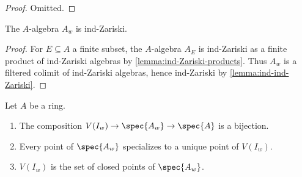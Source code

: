 \begin{proof}
  \leanok
  Omitted.
\end{proof}

\begin{lemma}
    The $A$-algebra $A_{w}$ is ind-Zariski.
    \label{lemma:w-localization-ind-Zariski}
    \leanok
\end{lemma}

\begin{proof}
    \leanok
    For $E \subseteq A$ a finite subset, the $A$-algebra $A_E$ is ind-Zariski
    as a finite product of ind-Zariski algebras by \ref{lemma:ind-Zariski-products}.
    Thus $A_w$ is a filtered colimit of ind-Zariski algebras, hence ind-Zariski
    by \ref{lemma:ind-ind-Zariski}.
\end{proof}

\begin{lemma}
    \label{lemma:w-localization-closed-points}
    \leanok
    Let $A$ be a ring.
    \begin{enumerate}
        \item The composition $V(I_w) \to \spec{A_w} \to \spec{A}$ is a bijection.
            \label{item:w-localization-bijection}
        \item Every point of $\spec{A_w}$ specializes to a unique point of $V(I_w)$. \label{item:w-localization-specializes}
        \item $V(I_w)$ is the set of closed points of $\spec{A_w}$. \label{item:w-localization-closed-points}
    \end{enumerate}
\end{lemma}

